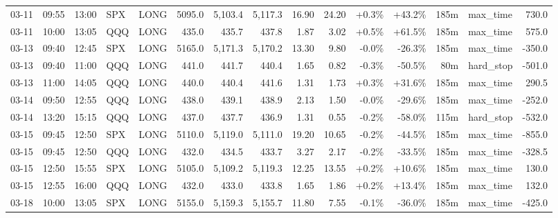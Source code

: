 \documentclass[11pt,a4paper,twoside]{article}
\begin{document}
\begin{landscape}
\begin{center}
\begin{longtable}{>{\color{txtmain}}l l l l l r r r r r r r r >{\color{txtmain}}l r}
03-11 & 09:55 & 13:00 & SPX & LONG & 5095.0 & 5,103.4 & 5,117.3 & 16.90 & 24.20 & \textcolor{wingreen}{+0.3\%} & \textcolor{wingreen}{+43.2\%} & 185m & max\_time & \textcolor{wingreen}{730.0} \\
03-11 & 10:00 & 13:05 & QQQ & LONG & 435.0 & 435.7 & 437.8 & 1.87 & 3.02 & \textcolor{wingreen}{+0.5\%} & \textcolor{wingreen}{+61.5\%} & 185m & max\_time & \textcolor{wingreen}{575.0} \\
03-13 & 09:40 & 12:45 & SPX & LONG & 5165.0 & 5,171.3 & 5,170.2 & 13.30 & 9.80 & \textcolor{lossred}{-0.0\%} & \textcolor{lossred}{-26.3\%} & 185m & max\_time & \textcolor{lossred}{-350.0} \\
03-13 & 09:40 & 11:00 & QQQ & LONG & 441.0 & 441.7 & 440.4 & 1.65 & 0.82 & \textcolor{lossred}{-0.3\%} & \textcolor{lossred}{-50.5\%} & 80m & hard\_stop & \textcolor{lossred}{-501.0} \\
03-13 & 11:00 & 14:05 & QQQ & LONG & 440.0 & 440.4 & 441.6 & 1.31 & 1.73 & \textcolor{wingreen}{+0.3\%} & \textcolor{wingreen}{+31.6\%} & 185m & max\_time & \textcolor{wingreen}{290.5} \\
03-14 & 09:50 & 12:55 & QQQ & LONG & 438.0 & 439.1 & 438.9 & 2.13 & 1.50 & \textcolor{lossred}{-0.0\%} & \textcolor{lossred}{-29.6\%} & 185m & max\_time & \textcolor{lossred}{-252.0} \\
03-14 & 13:20 & 15:15 & QQQ & LONG & 437.0 & 437.7 & 436.9 & 1.31 & 0.55 & \textcolor{lossred}{-0.2\%} & \textcolor{lossred}{-58.0\%} & 115m & hard\_stop & \textcolor{lossred}{-532.0} \\
03-15 & 09:45 & 12:50 & SPX & LONG & 5110.0 & 5,119.0 & 5,111.0 & 19.20 & 10.65 & \textcolor{lossred}{-0.2\%} & \textcolor{lossred}{-44.5\%} & 185m & max\_time & \textcolor{lossred}{-855.0} \\
03-15 & 09:45 & 12:50 & QQQ & LONG & 432.0 & 434.5 & 433.7 & 3.27 & 2.17 & \textcolor{lossred}{-0.2\%} & \textcolor{lossred}{-33.5\%} & 185m & max\_time & \textcolor{lossred}{-328.5} \\
03-15 & 12:50 & 15:55 & SPX & LONG & 5105.0 & 5,109.2 & 5,119.3 & 12.25 & 13.55 & \textcolor{wingreen}{+0.2\%} & \textcolor{wingreen}{+10.6\%} & 185m & max\_time & \textcolor{wingreen}{130.0} \\
03-15 & 12:55 & 16:00 & QQQ & LONG & 432.0 & 433.0 & 433.8 & 1.65 & 1.86 & \textcolor{wingreen}{+0.2\%} & \textcolor{wingreen}{+13.4\%} & 185m & max\_time & \textcolor{wingreen}{132.0} \\
03-18 & 10:00 & 13:05 & SPX & LONG & 5155.0 & 5,159.3 & 5,155.7 & 11.80 & 7.55 & \textcolor{lossred}{-0.1\%} & \textcolor{lossred}{-36.0\%} & 185m & max\_time & \textcolor{lossred}{-425.0} \\

\end{longtable}
\end{center}
\end{landscape}
\end{document}
